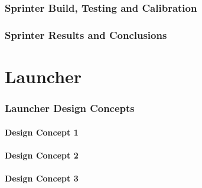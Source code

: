 \section{Sprinter Build, Testing and Calibration}
\label{sec:Sprinter Build, Testing and Calibration}

\clearpage
\section{Sprinter Results and Conclusions}
\label{sec:Sprinter Results and Conclusions}


\clearpage
\part{Launcher}
\label{part:launcher}

\section{Launcher Design Concepts}
\label{sec:Launcher Design Concepts}
  \subsection{Design Concept 1}
  \label{sub:Design Concept 1}

  \subsection{Design Concept 2}
  \label{sub:Design Concept 2}

  \subsection{Design Concept 3}
  \label{sub:Design Concept 3}

\clearpage
